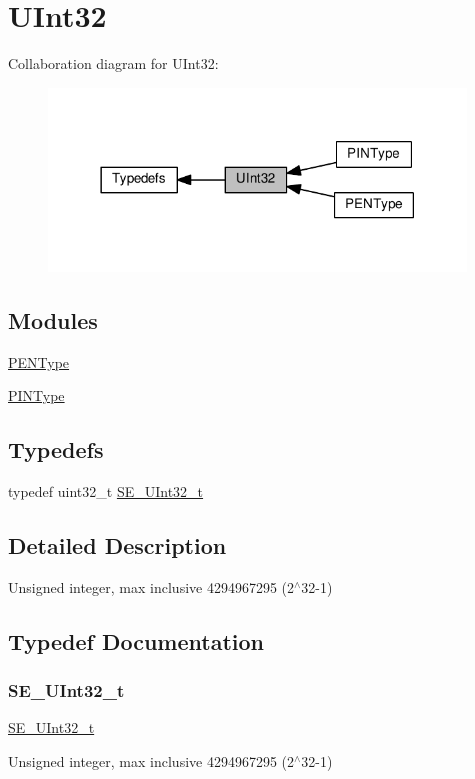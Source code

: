 \hypertarget{group__UInt32}{}\section{U\+Int32}
\label{group__UInt32}
Collaboration diagram for U\+Int32\+:\nopagebreak
\begin{figure}[H]
\begin{center}
\leavevmode
\includegraphics[width=314pt]{group__UInt32}
\end{center}
\end{figure}
\subsection*{Modules}
\begin{DoxyCompactItemize}
\item 
\hyperlink{group__PENType}{P\+E\+N\+Type}
\item 
\hyperlink{group__PINType}{P\+I\+N\+Type}
\end{DoxyCompactItemize}
\subsection*{Typedefs}
\begin{DoxyCompactItemize}
\item 
typedef uint32\+\_\+t \hyperlink{group__UInt32_ga70bd4ecda3c0c85d20779d685a270cdb}{S\+E\+\_\+\+U\+Int32\+\_\+t}
\end{DoxyCompactItemize}


\subsection{Detailed Description}
Unsigned integer, max inclusive 4294967295 (2$^\wedge$32-\/1) 

\subsection{Typedef Documentation}
\mbox{\label{group__UInt32_ga70bd4ecda3c0c85d20779d685a270cdb}} 
\subsubsection{\texorpdfstring{S\+E\+\_\+\+U\+Int32\+\_\+t}{SE\_UInt32\_t}}
{\footnotesize\ttfamily \hyperlink{group__UInt32_ga70bd4ecda3c0c85d20779d685a270cdb}{S\+E\+\_\+\+U\+Int32\+\_\+t}}

Unsigned integer, max inclusive 4294967295 (2$^\wedge$32-\/1) 